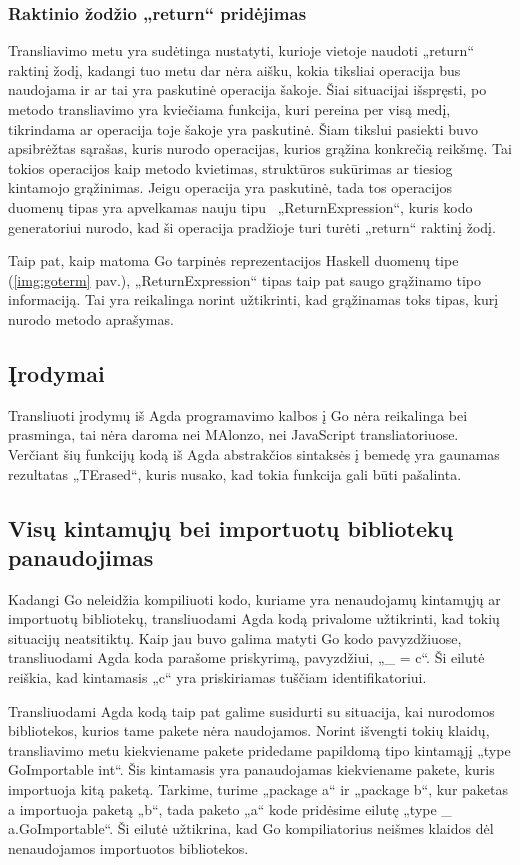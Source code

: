 \documentclass{VUMIFPSkursinis}
\begin{document}
\subsubsection{Raktinio žodžio „return“ pridėjimas}
Transliavimo metu yra sudėtinga nustatyti, kurioje vietoje naudoti „return“ raktinį žodį, kadangi tuo metu dar nėra aišku, kokia tiksliai operacija bus naudojama ir ar tai yra paskutinė operacija šakoje. Šiai situacijai išspręsti, po metodo transliavimo yra kviečiama funkcija, kuri pereina per visą medį, tikrindama ar operacija toje šakoje yra paskutinė. Šiam tikslui pasiekti buvo apsibrėžtas sąrašas, kuris nurodo operacijas, kurios grąžina konkrečią reikšmę. Tai tokios operacijos kaip metodo kvietimas, struktūros sukūrimas ar tiesiog kintamojo grąžinimas. Jeigu operacija yra paskutinė, tada tos operacijos duomenų tipas yra apvelkamas nauju tipu \mbox{ „ReturnExpression“}, kuris kodo generatoriui nurodo, kad ši operacija pradžioje turi turėti „return“ raktinį žodį. \par Taip pat, kaip matoma Go tarpinės reprezentacijos Haskell duomenų tipe (\ref{img:goterm} pav.), „ReturnExpression“ tipas taip pat saugo grąžinamo tipo informaciją. Tai yra reikalinga norint užtikrinti, kad grąžinamas toks tipas, kurį nurodo metodo aprašymas.
\subsection{Įrodymai}
Transliuoti įrodymų iš Agda programavimo kalbos į Go nėra reikalinga bei prasminga, tai nėra daroma nei MAlonzo, nei JavaScript transliatoriuose. Verčiant šių funkcijų kodą iš Agda abstrakčios sintaksės į bemedę yra gaunamas rezultatas „TErased“, kuris nusako, kad tokia funkcija gali būti pašalinta.
\subsection{Visų kintamųjų bei importuotų bibliotekų panaudojimas}
Kadangi Go neleidžia kompiliuoti kodo, kuriame yra nenaudojamų kintamųjų ar importuotų bibliotekų, transliuodami Agda kodą privalome užtikrinti, kad tokių situacijų neatsitiktų. Kaip jau buvo galima matyti Go kodo pavyzdžiuose, transliuodami Agda koda parašome priskyrimą, pavyzdžiui, „\_ = c“. Ši eilutė reiškia, kad kintamasis „c“ yra priskiriamas tuščiam identifikatoriui.\par Transliuodami Agda kodą taip pat galime susidurti su situacija, kai nurodomos bibliotekos, kurios tame pakete nėra naudojamos. Norint išvengti tokių klaidų, transliavimo metu kiekviename pakete pridedame papildomą tipo kintamąjį „type GoImportable int“. Šis kintamasis yra panaudojamas kiekviename pakete, kuris importuoja kitą paketą. Tarkime, turime „package a“ ir „package b“, kur paketas a importuoja paketą „b“, tada paketo „a“ kode pridėsime eilutę „type \_ a.GoImportable“. Ši eilutė užtikrina, kad Go kompiliatorius neišmes klaidos dėl nenaudojamos importuotos bibliotekos.
\end{document}
